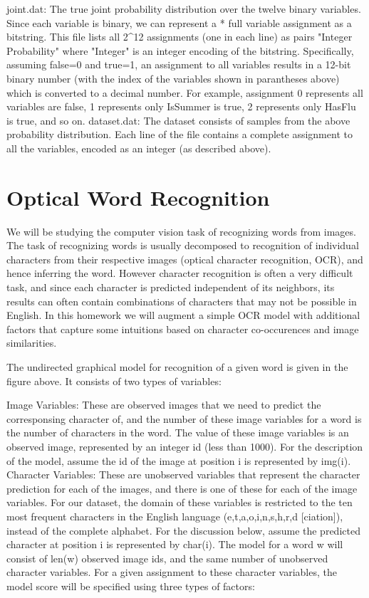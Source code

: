 joint.dat: The true joint probability distribution over the twelve binary variables. Since each variable is binary, we can represent a * full variable assignment as a bitstring. This file lists all 2^12 assignments (one in each line) as pairs "Integer Probability" where "Integer" is an integer encoding of the bitstring. Specifically, assuming false=0 and true=1, an assignment to all variables results in a 12-bit binary number (with the index of the variables shown in parantheses above) which is converted to a decimal number. For example, assignment 0 represents all variables are false, 1 represents only IsSummer is true, 2 represents only HasFlu is true, and so on.
dataset.dat: The dataset consists of samples from the above probability distribution. Each line of the file contains a complete assignment to all the variables, encoded as an integer (as described above).

\section{Optical Word Recognition}

We will be studying the computer vision task of recognizing words from images. The task of recognizing words is usually decomposed to recognition of individual characters from their respective images (optical character recognition, OCR), and hence inferring the word. However character recognition is often a very difficult task, and since each character is predicted independent of its neighbors, its results can often contain combinations of characters that may not be possible in English. In this homework we will augment a simple OCR model with additional factors that capture some intuitions based on character co-occurences and image similarities.



The undirected graphical model for recognition of a given word is given in the figure above. It consists of two types of variables:

Image Variables: These are observed images that we need to predict the corresponsing character of, and the number of these image variables for a word is the number of characters in the word. The value of these image variables is an observed image, represented by an integer id (less than 1000). For the description of the model, assume the id of the image at position i is represented by img(i).
Character Variables: These are unobserved variables that represent the character prediction for each of the images, and there is one of these for each of the image variables. For our dataset, the domain of these variables is restricted to the ten most frequent characters in the English language ({e,t,a,o,i,n,s,h,r,d} [ciation]), instead of the complete alphabet. For the discussion below, assume the predicted character at position i is represented by char(i).
The model for a word w will consist of len(w) observed image ids, and the same number of unobserved character variables. For a given assignment to these character variables, the model score will be specified using three types of factors:

